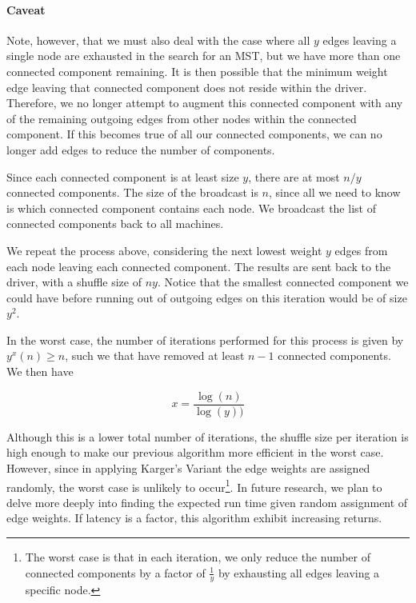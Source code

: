 \documentclass{article}
\begin{document}
\paragraph{Caveat} 

Note, however, that we must also deal with the case where all $y$ edges leaving a single node are exhausted in the search for an MST, but we have more than one connected component remaining. It is then possible that the minimum weight edge leaving that connected component does not reside within the driver. Therefore, we no longer attempt to augment this connected component with any of the remaining outgoing edges from other nodes within the connected component. If this becomes true of all our connected components, we can no longer add edges to reduce the number of components. 

Since each connected component is at least size $y$, there are at most $n/ y$ connected components. The size of the broadcast is $n$, since all we need to know is which connected component contains each node. We broadcast the list of connected components back to all machines. 

We repeat the process above, considering the next lowest weight $y$ edges from each node leaving each connected component. The results are sent back to the driver, with a shuffle size of $n y$. Notice that the smallest connected component we could have before running out of outgoing edges on this iteration would be of size $y^2$. 

In the worst case, the number of iterations performed for this process is given by $y^x(n) \geq n$, such we that have removed at least $n-1$ connected components. We then have

\[
x = \frac{\log(n)}{\log(y))}
\]

Although this is a lower total number of iterations, the shuffle size per iteration is high enough to make our previous algorithm more efficient in the worst case. However, since in applying Karger's Variant the edge weights are assigned randomly, the worst case is unlikely to occur\footnote{The worst case is that in each iteration, we only reduce the number of connected components by a factor of $\frac{1}{y}$ by exhausting all edges leaving a specific node.}. In future research, we plan to delve more deeply into finding the expected run time given random assignment of edge weights. If latency is a factor, this algorithm exhibit increasing returns.
\end{document}
